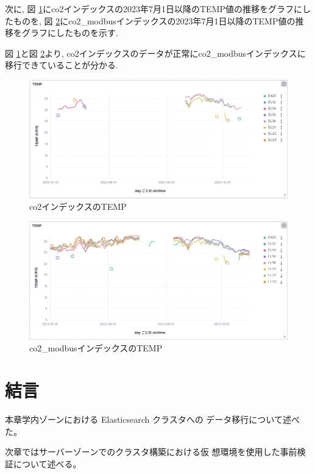 次に, 図 \ref{p24}にco2インデックスの2023年7月1日以降のTEMP値の推移をグラフにしたものを, 図 \ref{p28}にco2\_modbusインデックスの2023年7月1日以降のTEMP値の推移をグラフにしたものを示す.

図 \ref{p24}と図 \ref{p28}より, co2インデックスのデータが正常にco2\_modbusインデックスに移行できていることが分かる.

\begin{figure}[!ht]
    \begin{center}
        \includegraphics[width=160mm]{sotu/figure/co2Temp.png}
        \caption{co2インデックスのTEMP}
        \label{p24}
    \end{center}
\end{figure}

\begin{figure}[!ht]
    \begin{center}
        \includegraphics[width=160mm]{sotu/figure/co2ModbusTemp.png}
        \caption{co2\_modbusインデックスのTEMP}
        \label{p28}
    \end{center}
\end{figure}

\section{結言}
本章学内ゾーンにおける Elasticsearch クラスタへの
データ移行について述べた。

次章ではサーバーゾーンでのクラスタ構築における仮
想環境を使用した事前検証について述べる。